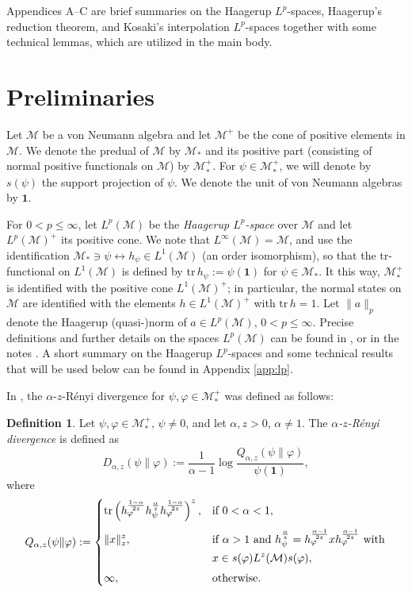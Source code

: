 \documentclass[12pt]{article}
\theoremstyle{definition}
\newtheorem{defi}[theorem]{Definition}
\theoremstyle{remark}
\numberwithin{equation}{section}
\def\Me{\mathcal M}
\def\Tr{\mathrm{tr}}
\def\1{\mathbf{1}}
\begin{document}
Appendices A--C are brief summaries on the Haagerup $L^p$-spaces, Haagerup's reduction theorem,
and Kosaki's interpolation $L^p$-spaces together with some technical lemmas, which are
utilized in the main body.


\section{Preliminaries}


Let $\Me$ be a von Neumann algebra and let $\Me^+$ be the cone of positive elements in $\Me$. We
denote the predual of $\Me$ by $\Me_*$ and its positive part (consisting of normal positive
functionals on $\Me$) by $\Me_*^+$. For $\psi\in \Me_*^+$, we will denote by $s(\psi)$ the support
projection  of $\psi$. We denote the unit of von Neumann algebras by $\1$.

For $0< p\le \infty$, let $L^p(\Me)$ be the \emph{Haagerup $L^p$-space}
\cite{haagerup1979lpspaces,terp1981lpspaces} over $\Me$ and let $L^p(\Me)^+$ its positive cone. We
{note that $L^\infty(\Me)=\Me$, and use the identification
$\Me_*\ni \psi \leftrightarrow h_\psi\in L^1(\Me)$ (an order isomorphism)},
so that the $\Tr$-functional on $L^1(\Me)$ is defined by $\Tr\,h_\psi:=\psi(\1)$ for $\psi\in \Me_*$. It this way,
$\Me_*^+$ is identified with the positive cone $L^1(\Me)^+$; in particular, the normal states
on $\Me$ are identified with the elements $h\in L^1(\Me)^+$ with $\Tr\,h=1$. Let $\|a\|_p$ denote the
Haagerup (quasi-)norm of $a\in L^p(\Me)$, $0<p\le\infty$. Precise definitions and further details on
the spaces $L^p(\Me)$ can be found in \cite[Chap.~9]{hiai2021lectures}, or in the notes
\cite{terp1981lpspaces}. A short summary on the Haagerup $L^p$-spaces and some technical results
that will be used below can be found in Appendix \ref{app:lp}.


In \cite{kato2023aremark, kato2023onrenyi}, the
$\alpha$-$z$-R\'enyi divergence for $\psi,\varphi\in \mathcal M_*^+$  was defined as follows:

\begin{defi}\label{defi:renyi} Let $\psi,\varphi\in \Me_*^+$, $\psi\ne 0$, and let
$\alpha,z>0$, $\alpha\ne 1$. The \emph{$\alpha$-$z$-R\'enyi divergence} is defined as 
\[
D_{\alpha,z}(\psi\|\varphi):=\frac1{\alpha-1}\log
\frac{Q_{\alpha,z}(\psi\|\varphi)}{\psi(\1)},
\]
where
\[
Q_{\alpha,z}(\psi\|\varphi):=\begin{dcases} \Tr
\left(h_\varphi^{\frac{1-\alpha}{2z}}h_\psi^{\frac{\alpha}{z}}h_\varphi^{\frac{1-\alpha}{2z}}\right)^z, &
\text{if } 0<\alpha<1,\\[0.3em]
\|x\|_z^z, & \text{if } \alpha>1 \text{ and }
h_\psi^{\frac{\alpha}{z}}=h_\varphi^{\frac{\alpha-1}{2z}}xh_\varphi^{\frac{\alpha-1}{2z}}
\ \text{with}\\ & x\in s(\varphi)L^z(\Me)s(\varphi),\\[0.3em]
\infty,& \text{otherwise}.
\end{dcases}
\]
\end{defi}
\end{document}
